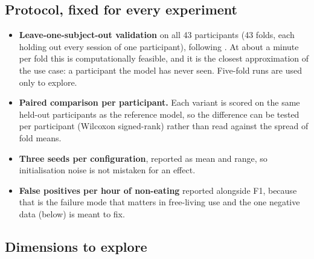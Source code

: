\subsection{Protocol, fixed for every experiment}

\begin{itemize}
  \item \textbf{Leave-one-subject-out validation} on all 43 participants
        (43 folds, each holding out every session of one participant),
        following \citet{saeb2017need}. At about a minute per fold this is
        computationally feasible, and it is the closest approximation of
        the use case: a participant the model has never seen. Five-fold
        runs are used only to explore.
  \item \textbf{Paired comparison per participant.} Each variant is scored
        on the same held-out participants as the reference model, so the
        difference can be tested per participant (Wilcoxon signed-rank)
        rather than read against the spread of fold means.
  \item \textbf{Three seeds per configuration}, reported as mean and range,
        so initialisation noise is not mistaken for an effect.
  \item \textbf{False positives per hour of non-eating} reported alongside
        F1, because that is the failure mode that matters in free-living use
        and the one negative data (below) is meant to fix.
\end{itemize}

\subsection{Dimensions to explore}

